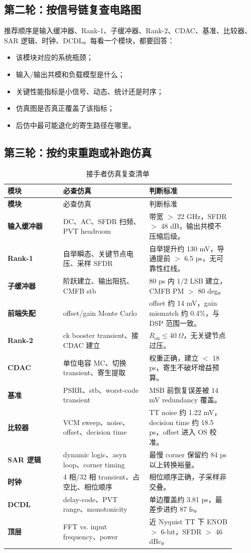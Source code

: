 \documentclass[UTF8,zihao=-4]{ctexart}
\begin{document}
\subsection{第二轮：按信号链复查电路图}

推荐顺序是输入缓冲器、Rank-1、子缓冲器、Rank-2、CDAC、基准、比较器、SAR 逻辑、时钟、DCDL。每看一个模块，都要回答：
\begin{itemize}
  \item 该模块对应的系统瓶颈；
  \item 输入/输出共模和负载模型是什么；
  \item 关键性能指标是小信号、动态、统计还是时序；
  \item 仿真图是否真正覆盖了该指标；
  \item 后仿中最可能退化的寄生路径在哪里。
\end{itemize}

\subsection{第三轮：按约束重跑或补跑仿真}

\begin{longtable}{>{\bfseries}p{0.22\linewidth}p{0.34\linewidth}p{0.34\linewidth}}
\caption{接手者仿真复查清单}\\
\toprule
模块 & 必查仿真 & 判断标准 \\
\midrule
\endfirsthead
\toprule
模块 & 必查仿真 & 判断标准 \\
\midrule
\endhead
输入缓冲器 & DC、AC、SFDR 扫频、PVT headroom & 带宽 \(>\) 22 GHz，SFDR \(>\) 48 dB，输出共模不压缩后级。\\
Rank-1 & 自举瞬态、关键节点电压、采样 SFDR & 自举提升约 130 mV，导通提前 \(>\) 6.5 ps，无可靠性红线。\\
子缓冲器 & 阶跃建立、输出阻抗、CMFB stb & 80 ps 内 \(1/2\) LSB 建立，CMFB PM \(>\) 80 deg。\\
前端失配 & offset/gain Monte Carlo & offset 约 14 mV，gain mismatch 约 0.4\%，与 DSP 范围一致。\\
Rank-2 & ck booster transient、接 CDAC 建立 & \(R_{\mathrm{on}}\leq 40~\Omega\)，无关键节点过压。\\
CDAC & 单位电容 MC、切换 transient、寄生提取 & 权重正确，建立 \(<\) 18 ps，寄生不破坏增益预算。\\
基准 & PSRR、stb、worst-code transient & MSB 前恢复误差被 14 mV redundancy 覆盖。\\
比较器 & VCM sweep、noise、offset、decision time & TT noise 约 1.22 mV，decision time 约 18.5 ps，offset 进入 OS 校准。\\
SAR 逻辑 & dynamic logic、asyn loop、corner timing & 最慢 corner 保留约 84 ps 以上转换裕量。\\
时钟 & 4 相/32 相 transient、占空比、相位顺序 & 相位顺序正确，子采样非交叠。\\
DCDL & delay-code、PVT range、monotonicity & 单边覆盖约 3.81 ps，最差步进约 87 fs。\\
顶层 & FFT vs. input frequency、power & 近 Nyquist TT 下 ENOB \(>\) 6-bit，SFDR \(>\) 46 dBc。\\
\bottomrule
\end{longtable}
\end{document}
